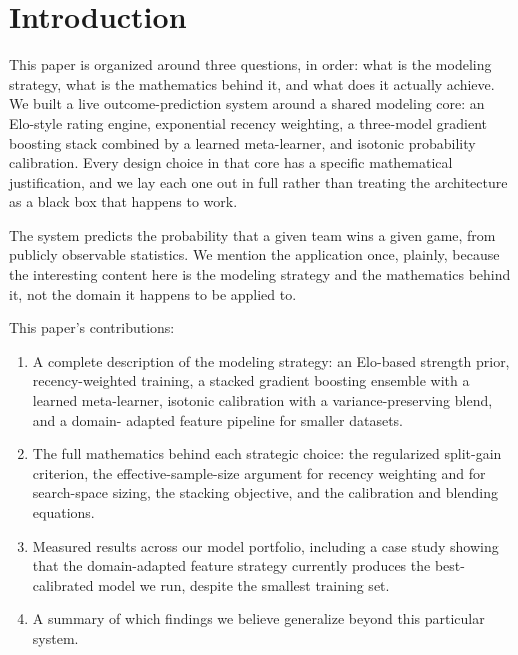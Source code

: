 \documentclass[conference]{IEEEtran}
\begin{document}
\section{Introduction}
\label{sec:intro}

This paper is organized around three questions, in order: what is the
modeling strategy, what is the mathematics behind it, and what does it
actually achieve. We built a live outcome-prediction system around a
shared modeling core: an Elo-style rating engine, exponential recency
weighting, a three-model gradient boosting stack combined by a learned
meta-learner, and isotonic probability calibration. Every design
choice in that core has a specific mathematical justification, and we
lay each one out in full rather than treating the architecture as a
black box that happens to work.

The system predicts the probability that a given team wins a given
game, from publicly observable statistics. We mention the application
once, plainly, because the interesting content here is the modeling
strategy and the mathematics behind it, not the domain it happens to
be applied to.

This paper's contributions:

\begin{enumerate}
  \item A complete description of the modeling strategy: an Elo-based
        strength prior, recency-weighted training, a stacked gradient
        boosting ensemble with a learned meta-learner, isotonic
        calibration with a variance-preserving blend, and a domain-
        adapted feature pipeline for smaller datasets.
  \item The full mathematics behind each strategic choice: the
        regularized split-gain criterion, the effective-sample-size
        argument for recency weighting and for search-space sizing,
        the stacking objective, and the calibration and blending
        equations.
  \item Measured results across our model portfolio, including a
        case study showing that the domain-adapted feature strategy
        currently produces the best-calibrated model we run, despite
        the smallest training set.
  \item A summary of which findings we believe generalize beyond this
        particular system.
\end{enumerate}

\end{document}
